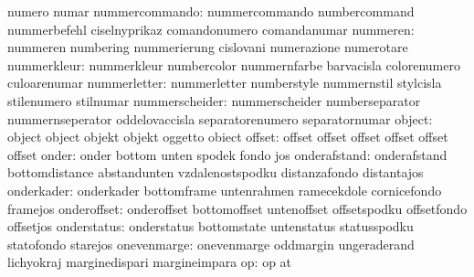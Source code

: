                            numero                    numar
           nummercommando: nummercommando            numbercommand
                           nummerbefehl              ciselnyprikaz
                           comandonumero             comandanumar
                 nummeren: nummeren                  numbering
                           nummerierung              cislovani
                           numerazione               numerotare
              nummerkleur: nummerkleur               numbercolor
                           nummernfarbe              barvacisla
                           colorenumero              culoarenumar
             nummerletter: nummerletter              numberstyle
                           nummernstil               stylcisla
                           stilenumero               stilnumar
           nummerscheider: nummerscheider            numberseparator
                           nummernseperator          oddelovaccisla
                           separatorenumero          separatornumar
                   object: object                    object
                           objekt                    objekt
                           oggetto                   obiect
                   offset: offset                    offset
                           offset                    offset
                           offset                    offset
                    onder: onder                     bottom
                           unten                     spodek
                           fondo                     jos
             onderafstand: onderafstand              bottomdistance
                           abstandunten              vzdalenostspodku
                           distanzafondo             distantajos
               onderkader: onderkader                bottomframe
                           untenrahmen               ramecekdole
                           cornicefondo              framejos
              onderoffset: onderoffset               bottomoffset
                           untenoffset               offsetspodku
                           offsetfondo               offsetjos
              onderstatus: onderstatus               bottomstate
                           untenstatus               statusspodku
                           statofondo                starejos
              onevenmarge: onevenmarge               oddmargin
                           ungeraderand              lichyokraj
                           marginedispari            margineimpara
                       op: op                        at
